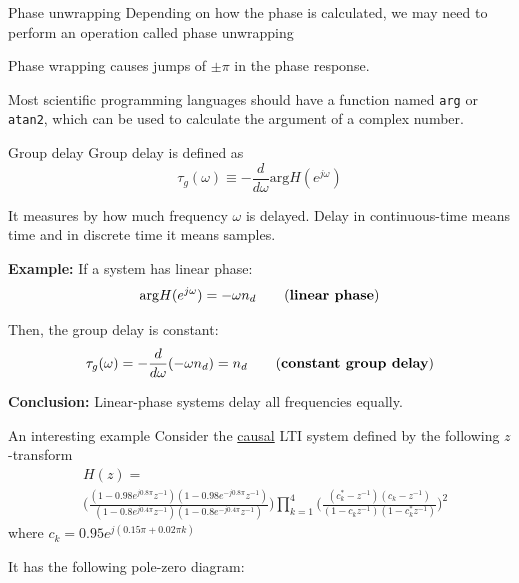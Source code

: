 \documentclass[10pt]{beamer}
\begin{document}
\begin{frame}{Phase unwrapping}
Depending on how the phase is calculated, we may need to perform an operation called phase unwrapping

Phase wrapping causes jumps of $\pm\pi$ in the phase response.

Most scientific programming languages should have a function named \texttt{arg} or \texttt{atan2}, which can be used to calculate the argument of a complex number.

\end{frame}

\begin{frame}{Group delay}
	Group delay is defined as 
	\begin{equation*}
	\tau_g(\omega) \equiv -\dfrac{d}{d\omega}\mathrm{arg} H(e^{j\omega}) \tag{group delay}
	\end{equation*}
	
	It measures by how much frequency $\omega$ is delayed. Delay in continuous-time means time and in discrete time it means samples.
	
	\textbf{Example:} If a system has linear phase:
	\begin{equation*}
		\mathrm{arg} H(e^{j\omega}) = -\omega n_d \tag{\textbf{linear phase}}
	\end{equation*} 
	
	Then, the group delay is constant:
	\begin{equation*}
	\tau_g(\omega) = -\dfrac{d}{d\omega}(-\omega n_d) = n_d \tag{\textbf{constant group delay}}
	\end{equation*} 
	
	\textbf{Conclusion:} Linear-phase systems delay all frequencies equally.	
\end{frame}


\begin{frame}{An interesting example}
	Consider the \underline{causal} LTI system defined by the following $z$-transform
	\begin{align*}
	&H(z) = \\ &\bigg(\frac{(1-0.98e^{j0.8\pi}z^{-1})(1-0.98e^{-j0.8\pi}z^{-1})}{(1-0.8e^{j0.4\pi}z^{-1})(1-0.8e^{-j0.4\pi}z^{-1})}\bigg)\prod_{k=1}^4\bigg(\frac{(c_k^* -z^{-1})(c_k -z^{-1})}{(1 -c_kz^{-1})(1 -c_k^*z^{-1})}\bigg)^2
	\end{align*}
	where $c_k = 0.95e^{j(0.15\pi + 0.02\pi k)}$
	
	It has the following pole-zero diagram:
	
	\begin{center}
		\resizebox{0.5\linewidth}{!}{}
	\end{center}
	
\end{frame}
\end{document}
